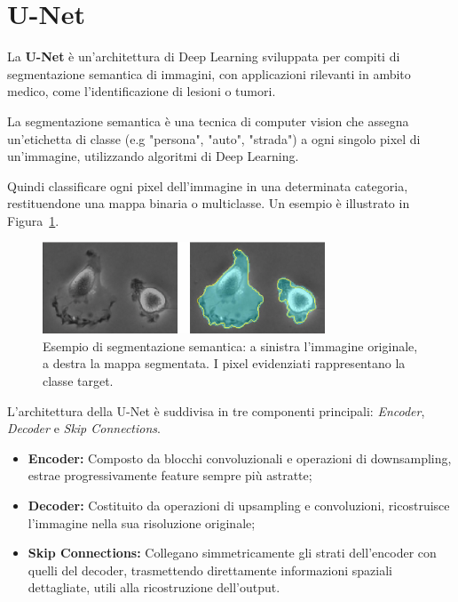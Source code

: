 \section{U-Net}

La \textbf{U-Net} è un’architettura di Deep Learning sviluppata per compiti di segmentazione semantica di immagini, con applicazioni rilevanti in ambito medico, come l’identificazione di lesioni o tumori. 

\begin{Definizione}
    La segmentazione semantica è una tecnica di computer vision che assegna un'etichetta di classe (e.g "persona", "auto", "strada") a ogni singolo pixel di un'immagine, utilizzando algoritmi di Deep Learning.
\end{Definizione}

Quindi classificare ogni pixel dell’immagine in una determinata categoria, restituendone una mappa binaria o multiclasse. Un esempio è illustrato in Figura~\ref{fig:cell}.

\begin{figure}[!ht]
\centering
\includegraphics[width=0.75\textwidth]{figure/Cells.png}
\caption{Esempio di segmentazione semantica: a sinistra l'immagine originale, a destra la mappa segmentata. I pixel evidenziati rappresentano la classe target.}
\label{fig:cell}
\end{figure}

L’architettura della U-Net è suddivisa in tre componenti principali: \textit{Encoder}, \textit{Decoder} e \textit{Skip Connections}.

\begin{itemize}
\item \textbf{Encoder:} Composto da blocchi convoluzionali e operazioni di downsampling, estrae progressivamente feature sempre più astratte;
\item \textbf{Decoder:} Costituito da operazioni di upsampling e convoluzioni, ricostruisce l’immagine nella sua risoluzione originale;
\item \textbf{Skip Connections:} Collegano simmetricamente gli strati dell’encoder con quelli del decoder, trasmettendo direttamente informazioni spaziali dettagliate, utili alla ricostruzione dell’output.
\end{itemize}

